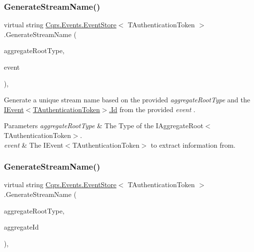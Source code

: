 \subsubsection{\texorpdfstring{Generate\+Stream\+Name()}{GenerateStreamName()}\hspace{0.1cm}{\footnotesize\ttfamily [1/2]}}
{\footnotesize\ttfamily virtual string \hyperlink{classCqrs_1_1Events_1_1EventStore}{Cqrs.\+Events.\+Event\+Store}$<$ T\+Authentication\+Token $>$.Generate\+Stream\+Name (\begin{DoxyParamCaption}\item[{Type}]{aggregate\+Root\+Type,  }\item[{\hyperlink{interfaceCqrs_1_1Events_1_1IEvent}{I\+Event}$<$ T\+Authentication\+Token $>$ @}]{event }\end{DoxyParamCaption})\hspace{0.3cm}{\ttfamily [protected]}, {\ttfamily [virtual]}}



Generate a unique stream name based on the provided {\itshape aggregate\+Root\+Type}  and the \hyperlink{interfaceCqrs_1_1Events_1_1IEvent_a2974e13d307c62c5cc438d668ff1783b_a2974e13d307c62c5cc438d668ff1783b}{I\+Event$<$\+T\+Authentication\+Token$>$.\+Id} from the provided {\itshape event} . 


\begin{DoxyParams}{Parameters}
{\em aggregate\+Root\+Type} & The Type of the I\+Aggregate\+Root$<$\+T\+Authentication\+Token$>$.\\
\hline
{\em event} & The I\+Event$<$\+T\+Authentication\+Token$>$ to extract information from.\\
\hline
\end{DoxyParams}
\mbox{\label{classCqrs_1_1Events_1_1EventStore_aba61739e47fdd0f7fce656f896cbe908_aba61739e47fdd0f7fce656f896cbe908}} 
\subsubsection{\texorpdfstring{Generate\+Stream\+Name()}{GenerateStreamName()}\hspace{0.1cm}{\footnotesize\ttfamily [2/2]}}
{\footnotesize\ttfamily virtual string \hyperlink{classCqrs_1_1Events_1_1EventStore}{Cqrs.\+Events.\+Event\+Store}$<$ T\+Authentication\+Token $>$.Generate\+Stream\+Name (\begin{DoxyParamCaption}\item[{Type}]{aggregate\+Root\+Type,  }\item[{Guid}]{aggregate\+Id }\end{DoxyParamCaption})\hspace{0.3cm}{\ttfamily [protected]}, {\ttfamily [virtual]}}



